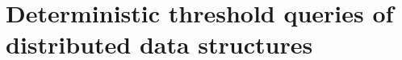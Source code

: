 \chapter{Deterministic threshold queries of distributed data structures}\label{ch:distributed} %








